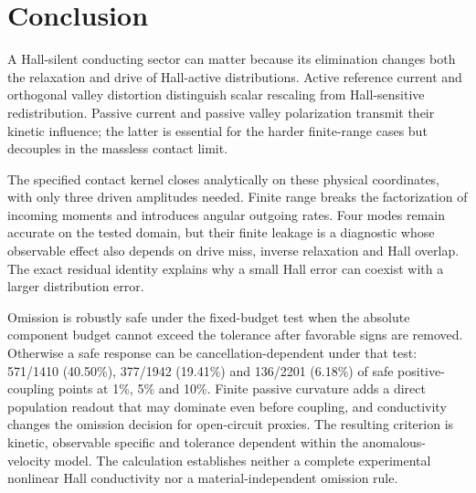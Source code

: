 \section{Conclusion}
A Hall-silent conducting sector can matter because its elimination changes both the relaxation and drive of Hall-active distributions. Active reference current and orthogonal valley distortion distinguish scalar rescaling from Hall-sensitive redistribution. Passive current and passive valley polarization transmit their kinetic influence; the latter is essential for the harder finite-range cases but decouples in the massless contact limit.

The specified contact kernel closes analytically on these physical coordinates, with only three driven amplitudes needed. Finite range breaks the factorization of incoming moments and introduces angular outgoing rates. Four modes remain accurate on the tested domain, but their finite leakage is a diagnostic whose observable effect also depends on drive miss, inverse relaxation and Hall overlap. The exact residual identity explains why a small Hall error can coexist with a larger distribution error.

Omission is robustly safe under the fixed-budget test when the absolute component budget cannot exceed the tolerance after favorable signs are removed. Otherwise a safe response can be cancellation-dependent under that test: 571/1410 (40.50\%), 377/1942 (19.41\%) and 136/2201 (6.18\%) of safe positive-coupling points at 1\%, 5\% and 10\%. Finite passive curvature adds a direct population readout that may dominate even before coupling, and conductivity changes the omission decision for open-circuit proxies. The resulting criterion is kinetic, observable specific and tolerance dependent within the anomalous-velocity model. The calculation establishes neither a complete experimental nonlinear Hall conductivity nor a material-independent omission rule.
